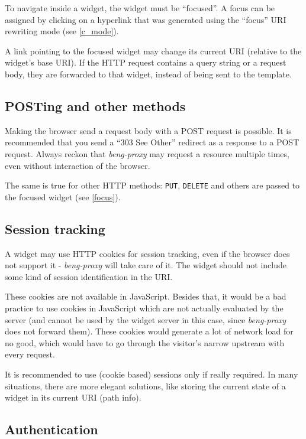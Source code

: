 \documentclass[a4paper,12pt]{article}
\begin{document}
To navigate inside a widget, the widget must be ``focused''.  A focus
can be assigned by clicking on a hyperlink that was generated using
the ``focus'' URI rewriting mode (see \ref{c_mode}).

A link pointing to the focused widget may change its current URI
(relative to the widget's base URI).  If the HTTP request contains a
query string or a request body, they are forwarded to that widget,
instead of being sent to the template.

\subsection{POSTing and other methods}

Making the browser send a request body with a POST request is
possible.  It is recommended that you send a ``303 See Other''
redirect as a response to a POST request.  Always reckon that
\emph{beng-proxy} may request a resource multiple times, even without
interaction of the browser.

The same is true for other HTTP methods: \texttt{PUT}, \texttt{DELETE}
and others are passed to the focused widget (see \ref{focus}).

\subsection{Session tracking}

A widget may use HTTP cookies for session tracking, even if the
browser does not support it - \emph{beng-proxy} will take care of it.
The widget should not include some kind of session identification in
the URI.

These cookies are not available in JavaScript.  Besides that, it would
be a bad practice to use cookies in JavaScript which are not actually
evaluated by the server (and cannot be used by the widget server in
this case, since \emph{beng-proxy} does not forward them).  These
cookies would generate a lot of network load for no good, which would
have to go through the visitor's narrow upstream with every request.

It is recommended to use (cookie based) sessions only if really
required.  In many situations, there are more elegant solutions, like
storing the current state of a widget in its current URI (path info).

\subsection{Authentication}
\label{authentication}
\end{document}
